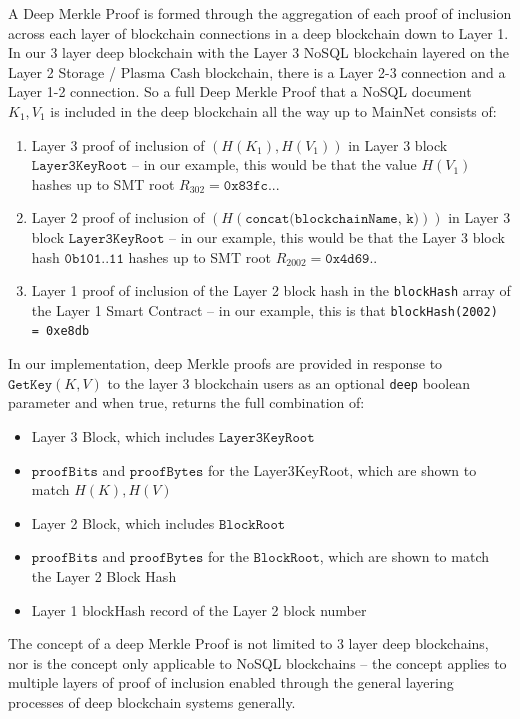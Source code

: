 \documentclass{article}
\newcommand{\hash}[1]{H(#1)}
\newcommand{\proofBits}{\texttt{proofBits}}
\newcommand{\proofBytes}{\texttt{proofBytes}}
\begin{document}
A Deep Merkle Proof is formed through the aggregation of each proof of inclusion across each layer of blockchain connections in a deep blockchain down to Layer 1.  In our 3 layer deep blockchain with the Layer 3 NoSQL blockchain layered on the Layer 2 Storage / Plasma Cash blockchain, there is a Layer 2-3 connection and a Layer 1-2 connection.  So a full Deep Merkle Proof that a NoSQL document $K_1, V_1$ is included in the deep blockchain all the way up to MainNet consists of:
\begin{enumerate}
\item Layer 3 proof of inclusion of $(H(K_1), H(V_1))$ in Layer 3 block $\texttt{Layer3KeyRoot}$ -- in our example, this would be that the value $\hash{V_1}$ hashes up to SMT root $R_{302}=\texttt{0x83fc..}$.

\item Layer 2 proof of inclusion of $(\hash{\texttt{concat(blockchainName, k)}})$ in Layer 3 block $\texttt{Layer3KeyRoot}$ -- in our example, this would be that the Layer 3 block hash  $\texttt{0b101..11}$ hashes up to SMT root
 $R_{2002}=\texttt{0x4d69..}$

\item Layer 1 proof of inclusion of the Layer 2 block hash in the \texttt{blockHash} array of the Layer 1 Smart Contract -- in our example, this is that \texttt{blockHash(2002) = 0xe8db}
\end{enumerate}
In our implementation, deep Merkle proofs are provided in response to $\texttt{GetKey}(K,V)$ to the layer 3 blockchain users as an optional \texttt{deep} boolean parameter and when true,  returns the full combination of:
\begin{itemize}
    \item Layer 3 Block, which includes $\texttt{Layer3KeyRoot}$
    \item $\proofBits$ and $\proofBytes$ for the Layer3KeyRoot, which are shown to match $H(K), H(V)$
    \item Layer 2 Block, which includes $\texttt{BlockRoot}$
    \item $\proofBits$ and $\proofBytes$ for the $\texttt{BlockRoot}$, which are shown to match the Layer 2 Block Hash
    \item Layer 1 blockHash record of the Layer 2 block number
\end{itemize}

The concept of a deep Merkle Proof is not limited to 3 layer deep blockchains, nor is the concept only applicable to NoSQL blockchains -- the concept applies to multiple layers of proof of inclusion enabled through the general layering processes of deep blockchain systems generally.
\end{document}
